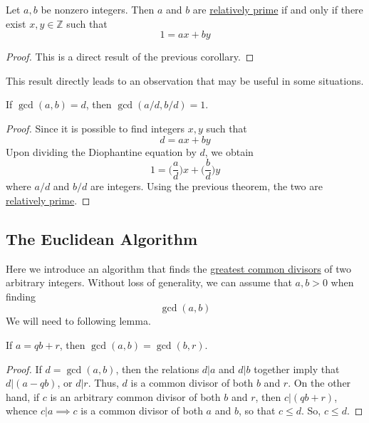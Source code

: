 \documentclass{article}
\newcounter{theorem}[section]
\begin{document}
\begin{theorem}
  \label{thm:characterization-of-relatively-prime-integers}
Let $a, b$ be nonzero integers. Then $a$ and $b$ are \hyperref[def:relatively-prime]{relatively prime} if and only if there exist $x, y \in \mathbb{Z}$ such that
\begin{equation}
  1 = a x + b y
\end{equation}
\end{theorem}
\begin{proof}
This is a direct result of the previous corollary. 
\end{proof}

This result directly leads to an observation that may be useful in some situations. 

\begin{corollary}
  \label{thm:reducing-a-pair-by-its-gcd}
If $\gcd(a, b) = d$, then $\gcd(a/d, b/d) = 1$. 
\end{corollary}
\begin{proof}
Since it is possible to find integers $x, y$ such that 
\begin{equation}
  d = ax + by
\end{equation}
Upon dividing the Diophantine equation by $d$, we obtain 
\begin{equation}
  1 = \bigg(\frac{a}{d}\bigg) x + \bigg( \frac{b}{d} \bigg) y
\end{equation}
where $a/d$ and $b/d$ are integers. Using the previous theorem, the two are \hyperref[def:relatively-prime]{relatively prime}. 
\end{proof}

\subsection{The Euclidean Algorithm}
Here we introduce an algorithm that finds the \hyperref[def:greatest-common-divisor]{greatest common divisors} of two arbitrary integers. Without loss of generality, we can assume that $a, b > 0$ when finding 
\begin{equation}
  \gcd(a, b)
\end{equation}
We will need to following lemma. 

\begin{lemma}
  \label{thm:invariance-of-the-gcd-under-division}
If $a = q b + r$, then $\gcd(a, b) = \gcd(b, r)$. 
\end{lemma}
\begin{proof}
If $d = \gcd(a, b)$, then the relations $d|a$ and $d|b$ together imply that $d|(a-qb)$, or $d|r$. Thus, $d$ is a common divisor of both $b$ and $r$. On the other hand, if $c$ is an arbitrary common divisor of both $b$ and $r$, then $c|(qb+r)$, whence $c|a \implies c$ is a common divisor of both $a$ and $b$, so that $c \leq d$. So, $c \leq d$. 
\end{proof}
\end{document}
